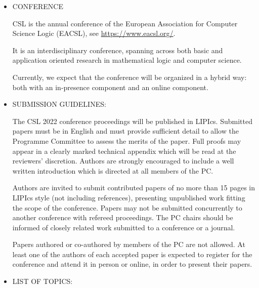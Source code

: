 \documentclass{article}
\begin{document}
\begin{itemize}\item  CONFERENCE 
 
  CSL is the annual conference of the European Association for Computer Science Logic (EACSL), see \href{https://www.eacsl.org/}{https://www.eacsl.org/}.  
 
  It is an interdisciplinary conference, spanning across both basic and application oriented research in mathematical logic and computer science.    
 
  Currently, we expect that the conference will be organized in a hybrid way: both with an in-presence component and an online component.  
 
\item  SUBMISSION GUIDELINES: 
 
  The CSL 2022 conference proceedings will be published in LIPIcs. Submitted papers must be in English and must provide sufficient detail to allow the Programme Committee to assess the merits of the paper. Full proofs may appear in a clearly marked technical appendix which will be read at the reviewers' discretion. Authors are strongly encouraged to include a well written introduction which is directed at all members of the PC. 
 
  Authors are invited to submit contributed papers of no more than 15 pages in LIPIcs style (not including references), presenting unpublished work fitting the scope of the conference. Papers may not be submitted concurrently to another conference with refereed proceedings. The PC chairs should be informed of closely related work submitted to a conference or a journal. 
 
  Papers authored or co-authored by members of the PC are not allowed. At least one of the authors of each accepted paper is expected to register for the conference and attend it in person or online, in order to present their papers. 
 
\item  LIST OF TOPICS: 
 

\end{itemize}
\end{document}
